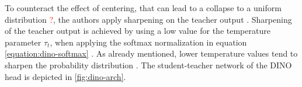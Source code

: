 To counteract the effect of centering, that can lead to a collapse to a uniform distribution \textcolor{red}{?}, the authors apply sharpening on the teacher output \textcolor{red}{\citep{Caron2021}}.
Sharpening of the teacher output is achieved by using a low value for the temperature parameter $\tau_t$, when applying the softmax normalization in equation \ref{equation:dino-softmax} \citep{Caron2021}.
As already mentioned, lower temperature values tend to sharpen the probability distribution \textcolor{red}{\citep{Hinton2015}}.
The student-teacher network of the DINO head is depicted in \ref{fig:dino-arch}.
